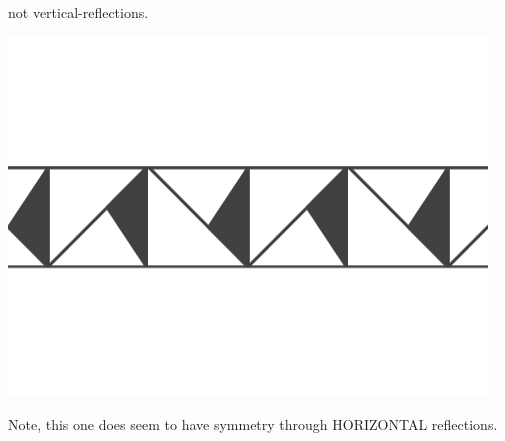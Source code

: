 \documentclass[noauthor,nooutcomes,12pt,hints]{ximera}
\begin{document}
\begin{question}
\begin{freeResponse}
\begin{enumerate}
      not vertical-reflections.
        \begin{center}
          \includegraphics[width=.6\textwidth]{ansGR.png}
        \end{center}
        Note, this one does seem to have symmetry through HORIZONTAL
        reflections.
    \end{enumerate}
  \end{freeResponse}
\end{question}
\end{document}
